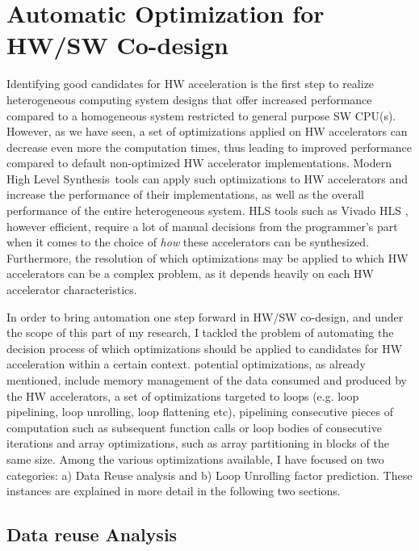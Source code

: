 \documentclass[]{usiinfthesis}
\newcommand{\HLS}{{High Level Synthesis}}
\begin{document}
%
%
%
%
%  
%
%
%
%
%

\chapter{Automatic Optimization for HW/SW Co-design}

Identifying good candidates for HW acceleration is the first step to realize heterogeneous
computing system designs that offer increased performance compared to a homogeneous system restricted
to general purpose SW CPU(s). However, as we have seen, a set of optimizations applied on HW accelerators can decrease 
even more the computation times, thus leading to improved performance compared to default
non-optimized HW accelerator implementations. 
Modern \HLS\ tools can apply such optimizations to 
HW accelerators and increase the performance of their implementations, as well as the overall performance 
of the entire heterogeneous system.
HLS tools such as Vivado HLS  \cite{VivadoHLSMar17}, however efficient, require a lot of manual decisions from the programmer's part when it comes to the
choice of {\em how} these accelerators can be synthesized.
Furthermore, the resolution of which optimizations may be applied to which HW accelerators can be a 
complex problem, as it depends heavily on each HW accelerator characteristics.\par

In order to bring automation one step forward in HW/SW co-design, and under the scope of this part of my 
research, I tackled the problem of automating the decision process of which optimizations should be 
applied to candidates for HW acceleration within a certain context. 
potential optimizations, as already mentioned, include memory management of the data consumed and produced by the HW accelerators, 
a set of optimizations targeted to loops (e.g. loop pipelining, loop unrolling, loop flattening etc), 
pipelining consecutive pieces of computation such as subsequent function calls or loop bodies of consecutive 
iterations and array optimizations, such as array partitioning in blocks of the same size. Among the various 
optimizations available, I have focused on two categories: a) Data Reuse analysis and b) Loop Unrolling 
factor prediction. These instances are explained in more detail in the following two sections.

\section{Data reuse Analysis}
\label{sec:dr}
\end{document}
